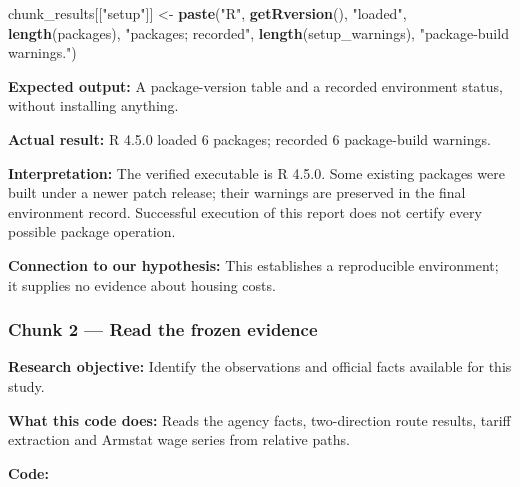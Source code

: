 \documentclass[
]{article}
\newenvironment{Shaded}{\begin{snugshade}}{\end{snugshade}}
\newcommand{\FunctionTok}[1]{\textcolor[rgb]{0.13,0.29,0.53}{\textbf{#1}}}
\newcommand{\NormalTok}[1]{#1}
\newcommand{\OtherTok}[1]{\textcolor[rgb]{0.56,0.35,0.01}{#1}}
\newcommand{\StringTok}[1]{\textcolor[rgb]{0.31,0.60,0.02}{#1}}
\begin{document}
\begin{Shaded}
\begin{Highlighting}[]
\NormalTok{chunk\_results[[}\StringTok{"setup"}\NormalTok{]] }\OtherTok{\textless{}{-}} \FunctionTok{paste}\NormalTok{(}\StringTok{"R"}\NormalTok{, }\FunctionTok{getRversion}\NormalTok{(), }\StringTok{"loaded"}\NormalTok{, }\FunctionTok{length}\NormalTok{(packages),}
                                 \StringTok{"packages; recorded"}\NormalTok{, }\FunctionTok{length}\NormalTok{(setup\_warnings), }\StringTok{"package{-}build warnings."}\NormalTok{)}
\end{Highlighting}
\end{Shaded}

\textbf{Expected output:} A package-version table and a recorded
environment status, without installing anything.

\textbf{Actual result:} R 4.5.0 loaded 6 packages; recorded 6
package-build warnings.

\textbf{Interpretation:} The verified executable is R 4.5.0. Some
existing packages were built under a newer patch release; their warnings
are preserved in the final environment record. Successful execution of
this report does not certify every possible package operation.

\textbf{Connection to our hypothesis:} This establishes a reproducible
environment; it supplies no evidence about housing costs.

\subsubsection{Chunk 2 --- Read the frozen
evidence}\label{chunk-2-read-the-frozen-evidence}

\textbf{Research objective:} Identify the observations and official
facts available for this study.

\textbf{What this code does:} Reads the agency facts, two-direction
route results, tariff extraction and Armstat wage series from relative
paths.

\textbf{Code:}
\end{document}
